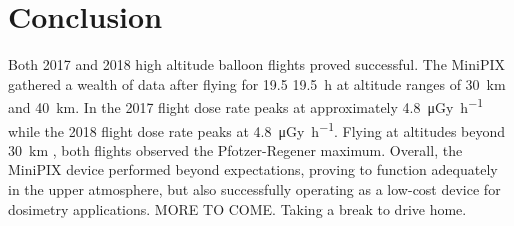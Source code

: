 \section{Conclusion}
\label{Conclusion}
Both 2017 and 2018 high altitude balloon flights proved successful.  
The MiniPIX gathered a wealth of data after flying for 19.5 \SI{19.5}{\hour} at altitude ranges of \SI{30}{\kilo\meter} and \SI{40}{\kilo\meter}.  
In the 2017 flight dose rate peaks at approximately \SI{4.8}{\micro\gray\per\hour} while the 2018 flight dose rate peaks at \SI{4.8}{\micro\gray\per\hour}.  
Flying at altitudes beyond \SI{30}{\kilo\meter} , both flights observed the Pfotzer-Regener maximum.
Overall, the MiniPIX device performed beyond expectations, proving to function adequately in the upper atmosphere, but also successfully operating as a low-cost device for dosimetry applications.
MORE TO COME.  Taking a break to drive home.
